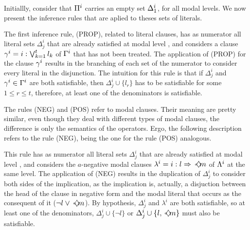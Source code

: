 Initiallly, consider that $\Pi^\ml$ carries an empty set $\Delta_1^\ml$, for all
modal levels. We now present the inference rules that are aplied to theses sets
of literals.

The first inference rule, (PROP), related to literal clauses, has as numerator
all literal sets $\Delta^i_j$ that are already satisfied at modal level \ml, and
considers a clause $\gamma^\ml = \cprop{t}{k}$ of $\Gamma^\ml$ that has not been
treated. The application of (PROP) for the clause $\gamma^\ml$ results in the
branching of each set of the numerator to consider every literal in the
disjunction.  The intuition for this rule is that if $\Delta^i_j$ and
$\gamma^\ml \in \Gamma^\ml$ are both satisfiable, then $\Delta^i_j \cup \{l_r\}$
has to be satisfiable for some $1 \leq r \leq t$, therefore, at least one of the
denominators is satisfiable.

The rules (NEG) and (POS) refer to modal clauses. Their meaning are pretty
similar, even though they deal with different types of modal clauses, the
difference is only the semantics of the operators. Ergo, the following
description refers to the rule (NEG), being the one for the rule (POS)
analogous.

This rule has as numerator all literal sets $\Delta^i_j$ that are already
satisfied at modal level \ml, and considers the $a$-negative modal clauses
$\lambda^i = \cneg$ of $\Lambda^\ml$ at the same level. The application of (NEG)
results in the duplication of $\Delta^i_j$ to consider both sides of the
implication, as the implication is, actually, a disjuction between the head of the
clause in negative form and the modal literal that occurs as the consequent
of it ($\neg l \lor\pos{a} m$). By hypothesis, $\Delta^i_j$ and $\lambda^i$ are
both satisfiable, so at least one of the denominators, $\Delta^i_j \cup \{\neg
l\}$ or $\Delta^i_j \cup \{l,\pos{a}m\}$ must also be satisfiable.

